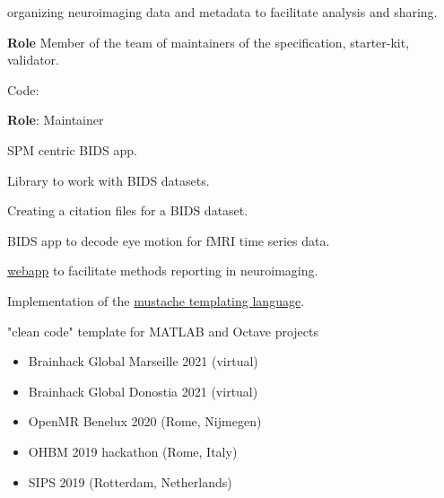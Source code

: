 
 organizing neuroimaging data and metadata to facilitate analysis and sharing.

\textbf{Role} Member of the team of maintainers of the specification, starter-kit, validator.

\textbullet Code: 

\vspace{5mm}


\textbf{Role}: Maintainer

 \matlabicon \octaveicon SPM centric BIDS app. 

 \matlabicon \octaveicon Library to work with BIDS datasets. 

 \pythonicon Creating a citation files for a BIDS dataset. 

 \pythonicon BIDS app to decode eye motion for fMRI time series data. 

 \pythonicon \vueicon \href{https://ohbm.github.io/cobidas/}{webapp} 
to facilitate methods reporting in neuroimaging. 

 \matlabicon \octaveicon 
Implementation of the \href{https://mustache.github.io/}{mustache templating language}.  

 \matlabicon \octaveicon "clean code" template for MATLAB and Octave projects 

\vspace{5mm}




\begin{itemize}
    \item Brainhack Global Marseille 2021 (virtual) 
    \item Brainhack Global Donostia 2021 (virtual) 
    \item OpenMR Benelux 2020 (Rome, Nijmegen) 
    \item OHBM 2019 hackathon (Rome, Italy) 
\end{itemize}

\begin{itemize}
    \item SIPS 2019 (Rotterdam, Netherlands)
\end{itemize}
